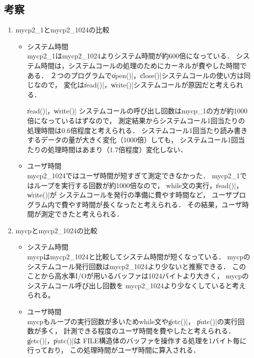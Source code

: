 \documentclass[a4j,twcolumn,11pt,nomag]{ltjarticle}      %
\begin{document}
\subsection*{考察}
\begin{enumerate}
  \item mycp2\_1とmycp2\_1024の比較
  \begin{itemize}
   \item システム時間 \\
   mycp2\_1はmycp2\_1024よりシステム時間が約600倍になっている．
   システム時間は，システムコールの処理のためにカーネルが費やした時間である．
   ２つのプログラムで\|open()|，\|close()|システムコールの使い方は同じなので，
   変化は\|read()|，\|write()|システムコールが原因だと考えられる．

   \|read()|，\|write()|
   システムコールの呼び出し回数はmycp\_1の方が約1000倍になっているはずなので，
   測定結果からシステムコール1回当たりの処理時間は0.6倍程度と考えられる．
   システムコール1回当たり読み書きするデータの量が大きく変化（1000倍）しても，
   システムコール1回当たりの処理時間はあまり（1.7倍程度）変化しない．

   \item ユーザ時間 \\
   mycp2\_1024ではユーザ時間が短すぎて測定できなかった．
   mycp2\_1ではループを実行する回数が約1000倍なので，
   while文の実行，\|read()|，\|write()|が
   システムコールを発行の準備に費やす時間など，
   ユーザプログラム内で費やす時間が長くなったと考えられる．
   その結果，ユーザ時間が測定できたと考えられる．
  \end{itemize}

  \item mycpとmycp2\_1024の比較
  \begin{itemize}
   \item システム時間 \\
   mycpはmycp2\_1024と比較してシステム時間が短くなっている．
   mycpのシステムコール発行回数はmycp2\_1024より少ないと推察できる．
   このことから高水準I/Oが用いるバッファは1024バイトより大きく，
   mycpのシステムコール呼び出し回数を
   mycp2\_1024より少なくしていると考えられる。

   \item ユーザ時間 \\
   mycpもループの実行回数が多いためwhile文や\|getc()|，
   \|putc()|の実行回数が多く，
   計測できる程度のユーザ時間を費やしたと考えられる．
   \|getc()|，\|putc()|は
   FILE構造体のバッファを操作する処理を1バイト毎に行っており，
   この処理時間がユーザ時間に算入される．
  \end{itemize}


\end{enumerate}
\end{document}
